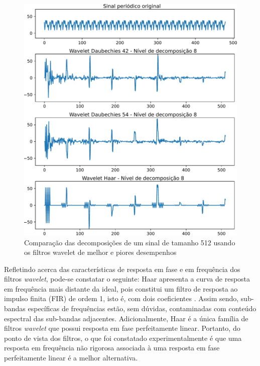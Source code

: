 	\begin{figure}[H]
		\centering
		\includegraphics[scale=.6]{images/results/haarDaubComparison/haarDaub42Comparison}
		\caption{Comparação das decomposições de um sinal de tamanho 512 usando os filtros wavelet de melhor e piores desempenhos }
		\label{fig:haardaub42comparison}
	\end{figure}
		
	\par Refletindo acerca das características de resposta em fase e em frequência dos filtros \textit{wavelet}, pode-se constatar o seguinte: Haar apresenta a curva de resposta em frequência mais distante da ideal, pois constitui um filtro de resposta ao impulso finita (FIR) de ordem 1, isto é, com dois coeficientes \cite{WaveletPropertiesBrowser}. Assim sendo, sub-bandas específicas de frequências estão, sem dúvidas, contaminadas com conteúdo espectral das sub-bandas adjacentes. Adicionalmente, Haar é a única família de filtros \textit{wavelet} que possui resposta em fase perfeitamente linear. Portanto, do ponto de vista dos filtros, o que foi constatado experimentalmente é que uma resposta em frequência não rigorosa associada à uma resposta em fase perfeitamente linear é a melhor alternativa.
	
